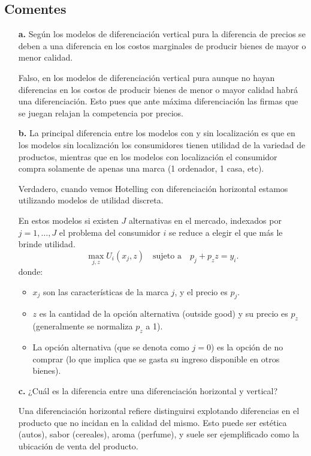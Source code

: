 \documentclass{exam}
\begin{document}
    \subsection{Comentes}
    \begin{itemize}
    \item[\textbf{a.}] Según los modelos de diferenciación vertical pura la diferencia de precios se deben a una diferencia en los costos marginales de producir bienes de mayor o menor calidad.
    \begin{solution}
        Falso, en los modelos de diferenciación vertical pura aunque no hayan diferencias en los costos de producir bienes de menor o mayor calidad habrá una diferenciación. Esto pues que ante máxima diferenciación las firmas que se juegan relajan la competencia por precios.
    \end{solution}
    \item[\textbf{b.}] La principal diferencia entre los modelos con y sin localización es que en los modelos sin localización los consumidores tienen utilidad de la variedad de productos, mientras que en los modelos con localización el consumidor compra solamente de apenas una marca (1 ordenador, 1 casa, etc).
    \begin{solution}
        Verdadero, cuando vemos Hotelling con diferenciación horizontal estamos utilizando modelos de utilidad discreta.
        
          En estos modelos si existen $J$ alternativas en el mercado, indexados por $j = 1, \ldots, J$ el problema del consumidor $i$ se reduce a elegir el que más le brinde utilidad.
            \[
            \max_{j,z} U_i(x_j, z) \quad \text{sujeto a} \quad p_j + p_z z = y_i.
            \]
            donde:
            \begin{itemize}
                \item $x_j$ son las características de la marca $j$, y el precio es $p_j$.
                \item $z$ es la cantidad de la opción alternativa (outside good) y su precio es $p_z$ (generalmente se normaliza $p_z$ a 1).
                \item La opción alternativa (que se denota como $j = 0$) es la opción de no comprar (lo que implica que se gasta su ingreso disponible en otros bienes).
            \end{itemize}
    \end{solution}
    \item[\textbf{c.}] ¿Cuál es la diferencia entre una diferenciación horizontal y vertical?
    \begin{solution}
        Una diferenciación horizontal refiere distinguirsi explotando diferencias en el producto que no incidan en la calidad del mismo. Esto puede ser estética (autos), sabor (cereales), aroma (perfume), y suele ser ejemplificado como la ubicación de venta del producto.


\end{solution}
\end{itemize}
\end{document}
